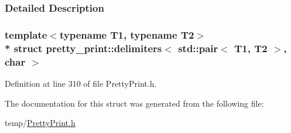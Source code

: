 \subsubsection{Detailed Description}
\subsubsection*{template$<$typename T1, typename T2$>$\\*
struct pretty\+\_\+print\+::delimiters$<$ std\+::pair$<$ T1, T2 $>$, char $>$}



Definition at line 310 of file Pretty\+Print.\+h.



The documentation for this struct was generated from the following file\+:\begin{DoxyCompactItemize}
\item 
temp/\hyperlink{PrettyPrint_8h}{Pretty\+Print.\+h}\end{DoxyCompactItemize}
